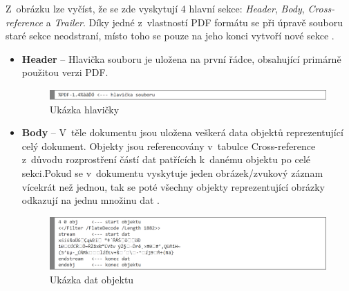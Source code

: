 Z~obrázku lze vyčíst, že se zde vyskytují 4 hlavní sekce: \textit{Header}, \textit{Body}, \textit{Cross-reference} a \textit{Trailer}. Díky jedné z~vlastností PDF formátu se při úpravě souboru staré sekce neodstraní, místo toho se pouze na jeho konci vytvoří nové sekce \cite{PDFInfoSec}.
\begin{itemize}
	\item \textbf{Header} -- Hlavička souboru je uložena na první řádce, obsahující primárně použitou verzi PDF.
	\begin{figure}[h!]
	\centering
	\includegraphics[width=15cm]{img/pdf_hlavicka}
	\caption{Ukázka hlavičky}
	\label{fig:pdf_header}
	\end{figure}
	
	\item \textbf{Body} -- V~těle dokumentu jsou uložena veškerá data objektů reprezentující celý dokument. Objekty jsou referencovány v~tabulce Cross-reference z~důvodu rozprostření částí dat patřících k~danému objektu po celé sekci.Pokud se v~dokumentu vyskytuje jeden obrázek/zvukový záznam vícekrát než jednou, tak se poté všechny objekty reprezentující obrázky odkazují na jednu množinu dat \cite{PDFAdobe}.
	\begin{figure}[h!]
	\centering
	\includegraphics[width=15cm]{img/pdf_body}
	\caption{Ukázka dat objektu}
	\label{fig:pdf_body}
	\end{figure}


\end{itemize}
